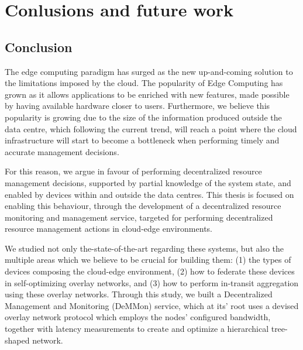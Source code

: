 

\chapter{Conlusions and future work} \label{cha:conclusions_future_work}

\section{Conclusion}

The edge computing paradigm has surged as the new up-and-coming solution to the limitations imposed by the cloud. The popularity of Edge Computing has grown as it allows applications to be enriched with new features, made possible by having available hardware closer to users. Furthermore, we believe this popularity is growing due to the size of the information produced outside the data centre, which following the current trend, will reach a point where the cloud infrastructure will start to become a bottleneck when performing timely and accurate management decisions. 

For this reason, we argue in favour of performing decentralized resource management decisions, supported by partial knowledge of the system state, and enabled by devices within and outside the data centres. This thesis is focused on enabling this behaviour, through the development of a decentralized resource monitoring and management service, targeted for performing decentralized resource management actions in cloud-edge environments.

We studied not only the-state-of-the-art regarding these systems, but also the multiple areas which we believe to be crucial for building them: (1) the types of devices composing the cloud-edge environment, (2) how to federate these devices in self-optimizing overlay networks, and (3) how to perform in-transit aggregation using these overlay networks. Through this study, we built a Decentralized Management and Monitoring (DeMMon) service, which at its’ root uses a devised overlay network protocol which employs the nodes' configured bandwidth, together with latency measurements to create and optimize a hierarchical tree-shaped network.

